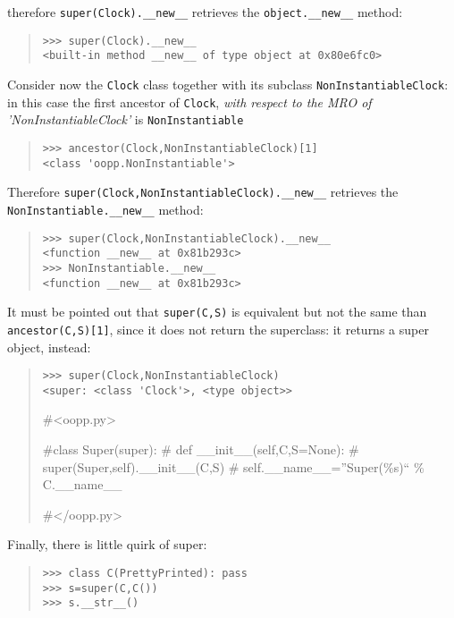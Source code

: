 \documentclass[10pt,english]{article}
\begin{document}
therefore \texttt{super(Clock).{\_}{\_}new{\_}{\_}} retrieves the \texttt{object.{\_}{\_}new{\_}{\_}} method:
\begin{quote}
\begin{verbatim}>>> super(Clock).__new__
<built-in method __new__ of type object at 0x80e6fc0>\end{verbatim}
\end{quote}

Consider now the \texttt{Clock} class together with its subclass 
\texttt{NonInstantiableClock}:
in this case the first ancestor of \texttt{Clock}, \emph{with respect to the MRO of 
'NonInstantiableClock'} is \texttt{NonInstantiable}
\begin{quote}
\begin{verbatim}>>> ancestor(Clock,NonInstantiableClock)[1] 
<class 'oopp.NonInstantiable'>\end{verbatim}
\end{quote}

Therefore \texttt{super(Clock,NonInstantiableClock).{\_}{\_}new{\_}{\_}} retrieves the 
\texttt{NonInstantiable.{\_}{\_}new{\_}{\_}} method:
\begin{quote}
\begin{verbatim}>>> super(Clock,NonInstantiableClock).__new__
<function __new__ at 0x81b293c>
>>> NonInstantiable.__new__
<function __new__ at 0x81b293c>\end{verbatim}
\end{quote}

It must be pointed out that \texttt{super(C,S)} is equivalent but not the same 
than \texttt{ancestor(C,S)[1]}, since it does not return the superclass: 
it returns a super object, instead:
\begin{quote}
\begin{verbatim}>>> super(Clock,NonInstantiableClock)
<super: <class 'Clock'>, <type object>>\end{verbatim}

{\#}{\textless}oopp.py{\textgreater}

{\#}class Super(super):
{\#}    def {\_}{\_}init{\_}{\_}(self,C,S=None):
{\#}        super(Super,self).{\_}{\_}init{\_}{\_}(C,S)
{\#}        self.{\_}{\_}name{\_}{\_}=''Super({\%}s)`` {\%} C.{\_}{\_}name{\_}{\_}

{\#}{\textless}/oopp.py{\textgreater}
\end{quote}

Finally, there is little quirk of super:
\begin{quote}
\begin{verbatim}>>> class C(PrettyPrinted): pass
>>> s=super(C,C())
>>> s.__str__()\end{verbatim}
\end{quote}
\end{document}
